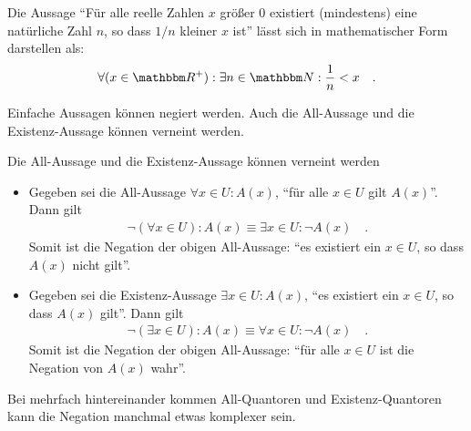 \begin{Unit}[Beispiel]
Die Aussage \enquote{Für alle reelle Zahlen $x$ größer 0 existiert 
(mindestens) eine natürliche Zahl $n$, so dass $1/n$ kleiner $x$ ist} lässt 
sich in mathematischer Form darstellen als:
\begin{align*}
  \forall (x \in \RR^+) : \exists n \in \NN : \frac{1}{n} < x \quad .
\end{align*}
\end{Unit}

\begin{Unit}
Einfache Aussagen können negiert werden. Auch die All-Aussage und die 
Existenz-Aussage können verneint werden. 

\begin{Satz} Die All-Aussage und die Existenz-Aussage können verneint werden
\begin{itemize}
\item Gegeben sei die All-Aussage $\forall x \in U : A(x)$, \enquote{für 
alle $x \in U$ gilt $A(x)$}. Dann gilt
  \begin{align}
    \neg \left( \forall x \in U \right) : A(x) \equiv \exists x \in U : 
    \neg A(x) \quad .
  \end{align}
  Somit ist die Negation der obigen All-Aussage: \enquote{es existiert ein 
  $x \in U$, so dass $A(x)$ nicht gilt}.
\item Gegeben sei die Existenz-Aussage $\exists x \in U : A(x)$, 
\enquote{es existiert ein $x \in U$, so dass $A(x)$ gilt}. Dann gilt
  \begin{align}
    \neg (\exists x \in U) : A(x) \equiv \forall x \in U : \neg A(x) \quad .
  \end{align}
  Somit ist die Negation der obigen All-Aussage: \enquote{für alle $x \in U$ 
  ist die Negation von $A(x)$ wahr}.
\end{itemize}
\end{Satz}

Bei mehrfach hintereinander kommen All-Quantoren und Existenz-Quantoren kann 
die Negation manchmal etwas komplexer sein.
\end{Unit}

